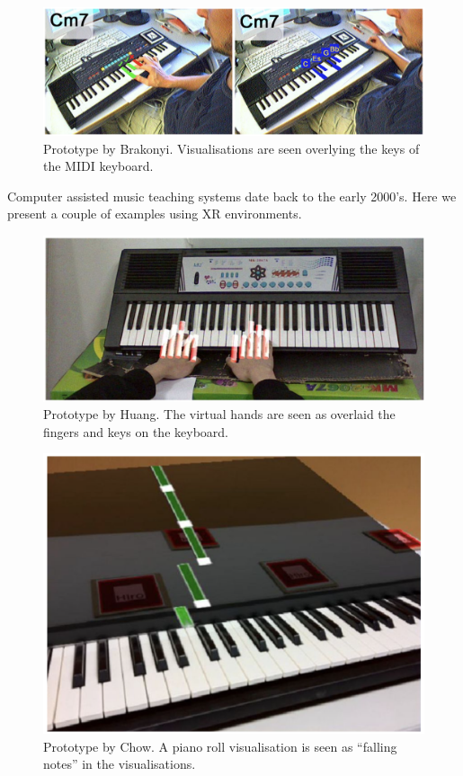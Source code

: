 \documentclass[manuscript,screen]{acmart}
\begin{document}
\begin{figure}[h]
\centering
 \includegraphics[width=12cm]{figures/barakonyi.png}
    \caption{Prototype by Brakonyi. Visualisations are seen overlying the keys of the MIDI keyboard.
    }\label{fig:barakonyi}
\end{figure}

Computer assisted music teaching systems date back to the early 2000's. Here we present a couple of examples using XR environments. 

\begin{figure}[h]
\centering
 \includegraphics[width=12cm]{figures/huang.png}
    \caption{Prototype by Huang. The virtual hands are seen as overlaid the fingers and keys on the keyboard.
    }\label{fig:huang}
\end{figure}
\begin{figure}[h]
\centering
 \includegraphics[width=12cm]{figures/chow.png}
    \caption{Prototype by Chow. A piano roll visualisation is seen as ``falling notes'' in the visualisations.
    }\label{fig:chow}
\end{figure}
\end{document}
